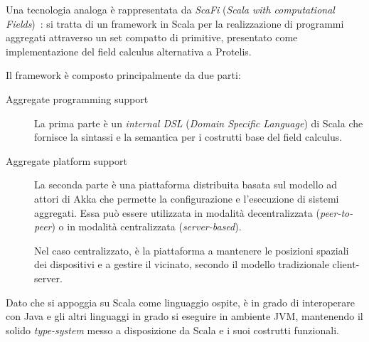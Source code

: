 Una tecnologia analoga è rappresentata da \emph{ScaFi} (\emph{\emph{Sca}la with computational \emph{Fi}elds})~\cite{aggregatescala-pmldc2016}:
si tratta di un framework in Scala per la realizzazione di programmi aggregati attraverso un set compatto di primitive, presentato come implementazione del field calculus alternativa a Protelis.

Il framework è composto principalmente da due parti:

\begin{description}
  \item[Aggregate programming support]
    La prima parte è un \emph{internal DSL} (\emph{Domain Specific Language}) di Scala che fornisce la sintassi e la semantica per i costrutti base del field calculus.

  \item[Aggregate platform support]
    La seconda parte è una piattaforma distribuita basata sul modello ad attori di Akka che permette la configurazione e l'esecuzione di sistemi aggregati.
    Essa può essere utilizzata in modalità decentralizzata (\emph{peer-to-peer}) %
    o in modalità centralizzata (\emph{server-based}).%



    Nel caso centralizzato, è la piattaforma a mantenere le posizioni spaziali dei dispositivi e a gestire il vicinato, secondo il modello tradizionale client-server.
\end{description}

Dato che si appoggia su Scala come linguaggio ospite, è in grado di interoperare con Java e gli altri linguaggi in grado si eseguire in ambiente JVM, mantenendo il solido \emph{type-system} messo a disposizione da Scala e i suoi costrutti funzionali.
